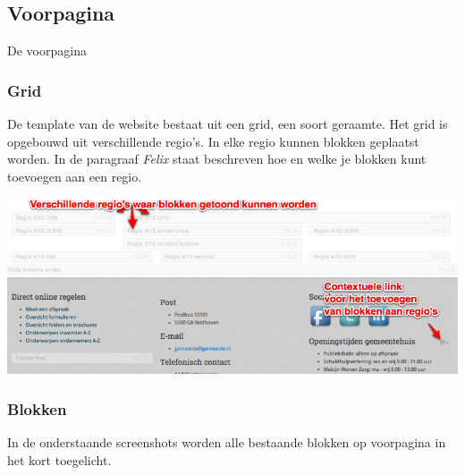 
\subsection{Voorpagina}\label{voorpagina}

De voorpagina

\subsubsection{Grid}

De template van de website bestaat uit een grid, een soort geraamte. Het grid is opgebouwd uit verschillende regio's. In elke regio kunnen blokken geplaatst worden. In de paragraaf \emph{Felix}  staat beschreven hoe en welke je blokken kunt toevoegen aan een regio. 

\bigskip

\begin{center}
	\includegraphics[width=\textwidth]{img/grid1.png}
\end{center}


\subsubsection{Blokken}

In de onderstaande screenshots worden alle bestaande blokken op voorpagina in het kort toegelicht.

\bigskip

